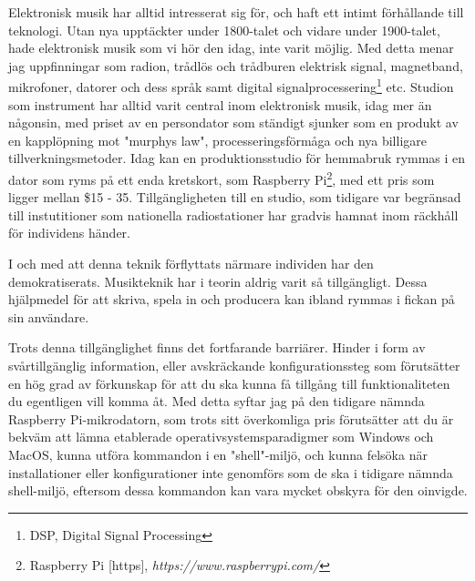 \documentclass{article}
\begin{document}
  Elektronisk musik har alltid intresserat sig för, och haft ett intimt förhållande till teknologi. Utan nya
  upptäckter under 1800-talet och vidare under 1900-talet, hade elektronisk musik som vi hör den idag, inte
  varit möjlig. Med detta menar jag uppfinningar som radion, trådlös och trådburen elektrisk signal,
  magnetband, mikrofoner, datorer och dess språk samt digital signalprocessering\footnote{DSP, Digital Signal
  Processing} etc. Studion som instrument har alltid varit central inom elektronisk musik, idag mer än
  någonsin, med priset av en persondator som ständigt sjunker som en produkt av en kapplöpning mot "murphys
  law", processeringsförmåga och nya billigare tillverkningsmetoder. Idag kan en produktionsstudio för
  hemmabruk rymmas i en dator som ryms på ett enda kretskort, som Raspberry Pi\footnote{Raspberry Pi [https],
  \emph{https://www.raspberrypi.com/}}, med ett pris som ligger mellan \$15 - 35. Tillgängligheten till en
  studio, som tidigare var begränsad till instutitioner som nationella radiostationer har gradvis hamnat inom
  räckhåll för individens händer.

  I och med att denna teknik förflyttats närmare individen har den demokratiserats. Musikteknik har i teorin
  aldrig varit så tillgängligt. Dessa hjälpmedel för att skriva, spela in och producera kan ibland rymmas i
  fickan på sin användare.

  Trots denna tillgänglighet finns det fortfarande barriärer. Hinder i form av svårtillgänglig information,
  eller avskräckande konfigurationssteg som förutsätter en hög grad av förkunskap för att du ska kunna få
  tillgång till funktionaliteten du egentligen vill komma åt. Med detta syftar jag på den tidigare nämnda
  Raspberry Pi-mikrodatorn, som trots sitt överkomliga pris förutsätter att du är bekväm att lämna etablerade
  operativsystemsparadigmer som Windows och MacOS, kunna utföra kommandon i en "shell"-miljö, och kunna
  felsöka när installationer eller konfigurationer inte genomförs som de ska i tidigare nämnda shell-miljö,
  eftersom dessa kommandon kan vara mycket obskyra för den oinvigde. 
	
\end{document}
